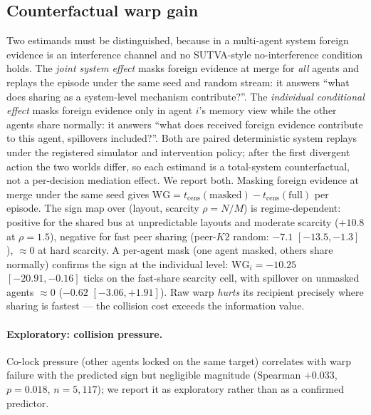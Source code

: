 \documentclass{article}
\begin{document}
\subsection{Counterfactual warp gain}
\label{p2:sec:gain}

Two estimands must be distinguished, because in a multi-agent system
foreign evidence is an interference channel and no SUTVA-style
no-interference condition holds. The \emph{joint system effect}
masks foreign evidence at merge for \emph{all} agents and replays the
episode under the same seed and random stream: it answers ``what does
sharing as a system-level mechanism contribute?''. The
\emph{individual conditional effect} masks foreign evidence only in
agent $i$'s memory view while the other agents share normally: it
answers ``what does received foreign evidence contribute to this
agent, spillovers included?''. Both are paired deterministic system
replays under the registered simulator and intervention policy; after
the first divergent action the two worlds differ, so each estimand is
a total-system counterfactual, not a per-decision mediation effect.
We report both. Masking foreign evidence at merge under the same seed
gives $\mathrm{WG} = t_{\text{cens}}(\text{masked}) -
t_{\text{cens}}(\text{full})$ per episode. The sign map over (layout,
scarcity $\rho{=}N/M$) is regime-dependent: positive for the shared
bus at unpredictable layouts and moderate scarcity ($+10.8$ at
$\rho{=}1.5$), negative for fast peer sharing (peer-$K2$ random:
$-7.1$ $[-13.5,-1.3]$), ${\approx}0$ at hard scarcity. A per-agent
mask (one agent masked, others share normally) confirms the sign at
the individual level: $\mathrm{WG}_i = -10.25$ $[-20.91,-0.16]$ ticks
on the fast-share scarcity cell, with spillover on unmasked agents
${\approx}0$ ($-0.62$ $[-3.06,+1.91]$). Raw warp \emph{hurts} its
recipient precisely where sharing is fastest --- the collision cost
exceeds the information value.

\paragraph{Exploratory: collision pressure.} Co-lock pressure (other
agents locked on the same target) correlates with warp failure with
the predicted sign but negligible magnitude (Spearman $+0.033$,
$p{=}0.018$, $n{=}5{,}117$); we report it as exploratory rather than
as a confirmed predictor.
\end{document}
